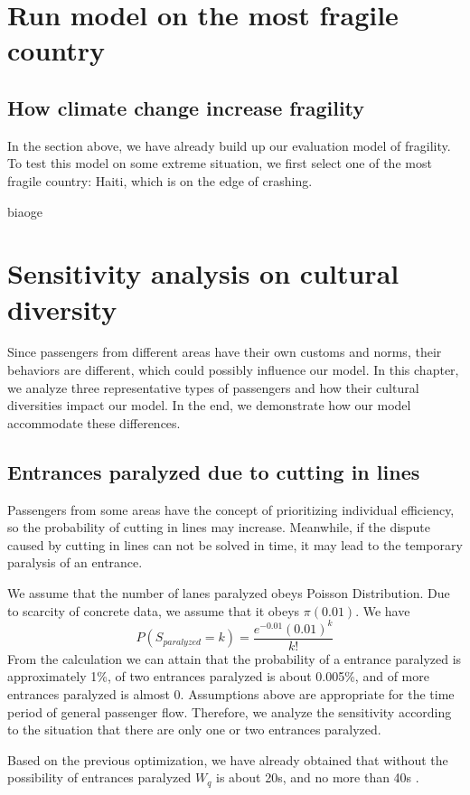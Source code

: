 \documentclass{mcmthesis}
\begin{document}
	\section{Run model on the most fragile country}
	\subsection{How climate change increase fragility}
In the section above, we have already build up our evaluation model of fragility. To test this model on some extreme situation, we first select one of the most fragile country: Haiti, which is on the edge of crashing.

biaoge





	\section{Sensitivity analysis on cultural diversity}
	Since passengers from different areas have their own customs and norms, their behaviors are different, which could possibly influence our model. In this chapter, we analyze three representative types of passengers and how their cultural diversities impact our model. In the end, we demonstrate how our model accommodate these differences. 
	\subsection{Entrances paralyzed due to cutting in lines}
	Passengers from some areas have the concept of prioritizing individual efficiency, so the probability of cutting in lines may increase. Meanwhile, if the dispute caused by cutting in lines can not be solved in time, it may lead to the temporary paralysis of an entrance.
	
	We assume that the number of lanes paralyzed obeys Poisson Distribution. Due to scarcity of concrete data, we assume that it obeys $\pi(0.01)$. We have
	$$P(S_{paralyzed}=k)=\frac{e^{-0.01}(0.01)^k}{k!}$$
	From the calculation we can attain that the probability of a entrance paralyzed is approximately 1\%, of two entrances paralyzed is about 0.005\%, and of more entrances paralyzed is almost 0. Assumptions above are appropriate for the time period of general passenger flow. Therefore, we analyze the sensitivity according to the situation that there are only one or two entrances paralyzed.
	
	Based on the previous optimization, we have already obtained that without the possibility of entrances paralyzed $W_q$ is about 20s, and no more than 40s .
\end{document}
